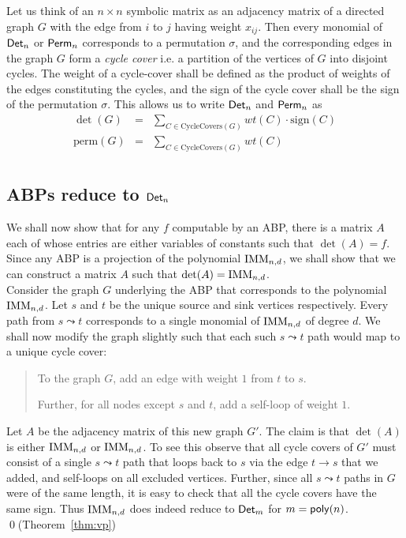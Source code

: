 Let us think of an $n\times n$ symbolic matrix as an adjacency matrix of a directed graph $G$ with the edge from $i$ to $j$ having weight $x_{ij}$. Then every monomial of $\mathsf{Det}_n$ or $\mathsf{Perm}_n$ corresponds to a permutation $\sigma$, and the corresponding edges in the graph $G$ form a \emph{cycle cover} i.e. a partition of the vertices of $G$ into disjoint cycles. The weight of a cycle-cover shall be defined as the product of weights of the edges constituting the cycles, and the sign of the cycle cover shall be the sign of the permutation $\sigma$. This allows us to write $\mathsf{Det}_n$ and $\mathsf{Perm}_n$ as
\begin{eqnarray*}
\det(G) & = & \sum_{C\in \mathrm{CycleCovers}(G)} wt(C) \cdot \mathrm{sign}(C)\\
\mathrm{perm}(G) & = & \sum_{C\in \mathrm{CycleCovers}(G)} wt(C) \\
\end{eqnarray*}

\subsection{ABPs reduce to $\mathsf{Det}_n$}

We shall now show that for any $f$ computable by an ABP, there is a matrix  $A$ each of whose entries are either variables of constants such that $\det(A) = f$. Since any ABP is a projection of the polynomial $\mathrm{IMM}_{n,d}$, we shall show that we can construct a matrix  $A$  such that $\det(A) = \mathrm{IMM}_{n,d}$. \\

Consider the graph $G$ underlying the ABP that corresponds to the polynomial $\mathrm{IMM}_{n,d}$. Let $s$ and $t$ be the unique source and sink vertices respectively. Every path from $s\leadsto t$ corresponds to a single monomial of $\mathrm{IMM}_{n,d}$ of degree $d$. We shall now modify the graph slightly such that each such $s\leadsto t$ path would map to a unique cycle cover:

\begin{quote}
  To the graph $G$, add an edge with weight $1$ from $t$ to $s$. 

  Further, for all nodes except $s$ and $t$, add a self-loop of weight $1$. 
\end{quote}

Let $A$ be the adjacency matrix of this new graph $G'$. The claim is that $\det(A)$ is either $\mathrm{IMM}_{n,d}$ or $\mathrm{IMM}_{n,d}$. To see this observe that all cycle covers of $G'$ must consist of a single $s\leadsto t$ path that loops back to $s$ via the edge $t\rightarrow s$ that we added, and self-loops on all excluded vertices. Further, since all $s\leadsto t$ paths in $G$ were of the same length, it is easy to check that all the cycle covers have the same sign. Thus $\mathrm{IMM}_{n,d}$ does indeed reduce to $\mathsf{Det}_m$ for $m = \mathsf{poly}(n)$. \qed {\footnotesize (Theorem~\ref{thm:vp})}\\


